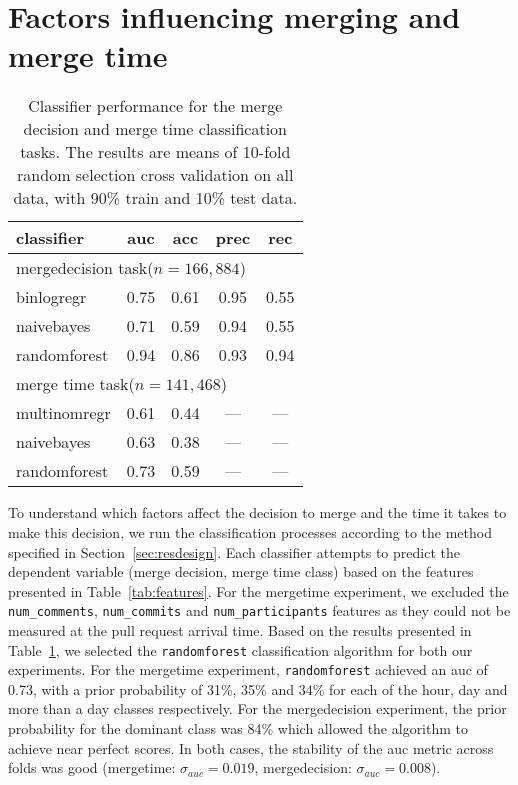 \documentclass{sig-alternate}
\begin{document}
\section{Factors influencing merging and merge time}
\label{sec:accrej}

\begin{table}
  \centering
  \begin{tabular}{lcccc}
    \hline
    {\bf classifier} & {\sc auc} & {\sc acc} & {\sc prec} & {\sc rec} \\
    \hline
    \multicolumn{4}{l}{\textsf{mergedecision} task($n = 166,884$)} \\
    binlogregr    & 0.75 & 0.61 & 0.95  & 0.55 \\
    naivebayes    & 0.71 & 0.59 & 0.94 &  0.55 \\
    randomforest  & 0.94 & 0.86 & 0.93 & 0.94 \\
    \hline
    \multicolumn{4}{l}{\textsf{merge time} task($n = 141,468$)} \\
    multinomregr  & 0.61 & 0.44 & --- & --- \\
    naivebayes    & 0.63 & 0.38 & --- & ---  \\
    randomforest  & 0.73 & 0.59 & --- & ---   \\
    \hline
  \end{tabular}
  \caption{Classifier performance for the merge decision and merge time
  classification tasks. The results are means of 10-fold random selection
  cross validation on all data, with 90\% train and 10\% test data.}
  \label{tab:classif-perf}
\end{table}

To understand which factors affect the decision to merge and the time it takes to make this decision,
we run the classification processes according to the method specified in
Section~\ref{sec:resdesign}. Each classifier attempts to predict the dependent
variable (merge decision, merge time class) based on the features presented in
Table~\ref{tab:features}. For the \textsf{mergetime} experiment, we excluded the
\texttt{num\_comments}, \texttt{num\_commits} and \texttt{num\_participants}
features as they could not be measured at the pull request arrival
time. Based on the results presented in Table~\ref{tab:classif-perf}, we
selected the \texttt{randomforest} classification algorithm for both our
experiments. For the \textsf{mergetime} experiment, \texttt{randomforest}
achieved an {\sc auc} of 0.73, with a prior probability of 31\%, 35\% and 34\%
for each of the \textsf{hour}, \textsf{day} and \textsf{more than a day} classes
respectively. For the \textsf{mergedecision} experiment, the prior probability
for the dominant class was 84\% which allowed the algorithm to achieve near
perfect scores. In both cases, the stability of the {\sc auc} metric across
folds was good (\textsf{mergetime}: $\sigma_{auc} = 0.019$,
\textsf{mergedecision}: $\sigma_{auc} = 0.008$).
\end{document}
